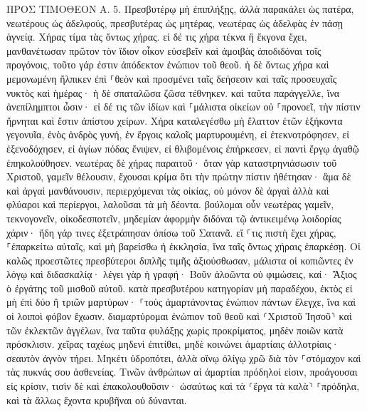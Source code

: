 \documentclass[twoside, 9pt]{extreport}
\begin{document}
ΠΡΟΣ ΤΙΜΟΘΕΟΝ Α.
5.
Πρεσβυτέρῳ μὴ ἐπιπλήξῃς, ἀλλὰ παρακάλει ὡς πατέρα, νεωτέρους ὡς ἀδελφούς, 
πρεσβυτέρας ὡς μητέρας, νεωτέρας ὡς ἀδελφὰς ἐν πάσῃ ἁγνείᾳ. 
Χήρας τίμα τὰς ὄντως χήρας. 
εἰ δέ τις χήρα τέκνα ἢ ἔκγονα ἔχει, μανθανέτωσαν πρῶτον τὸν ἴδιον οἶκον εὐσεβεῖν καὶ ἀμοιβὰς ἀποδιδόναι τοῖς προγόνοις, τοῦτο γάρ ἐστιν ἀπόδεκτον ἐνώπιον τοῦ θεοῦ. 
ἡ δὲ ὄντως χήρα καὶ μεμονωμένη ἤλπικεν ἐπὶ ⸀θεὸν καὶ προσμένει ταῖς δεήσεσιν καὶ ταῖς προσευχαῖς νυκτὸς καὶ ἡμέρας· 
ἡ δὲ σπαταλῶσα ζῶσα τέθνηκεν. 
καὶ ταῦτα παράγγελλε, ἵνα ἀνεπίλημπτοι ὦσιν· 
εἰ δέ τις τῶν ἰδίων καὶ ⸀μάλιστα οἰκείων οὐ ⸀προνοεῖ, τὴν πίστιν ἤρνηται καὶ ἔστιν ἀπίστου χείρων. 
Χήρα καταλεγέσθω μὴ ἔλαττον ἐτῶν ἑξήκοντα γεγονυῖα, ἑνὸς ἀνδρὸς γυνή, 
ἐν ἔργοις καλοῖς μαρτυρουμένη, εἰ ἐτεκνοτρόφησεν, εἰ ἐξενοδόχησεν, εἰ ἁγίων πόδας ἔνιψεν, εἰ θλιβομένοις ἐπήρκεσεν, εἰ παντὶ ἔργῳ ἀγαθῷ ἐπηκολούθησεν. 
νεωτέρας δὲ χήρας παραιτοῦ· ὅταν γὰρ καταστρηνιάσωσιν τοῦ Χριστοῦ, γαμεῖν θέλουσιν, 
ἔχουσαι κρίμα ὅτι τὴν πρώτην πίστιν ἠθέτησαν· 
ἅμα δὲ καὶ ἀργαὶ μανθάνουσιν, περιερχόμεναι τὰς οἰκίας, οὐ μόνον δὲ ἀργαὶ ἀλλὰ καὶ φλύαροι καὶ περίεργοι, λαλοῦσαι τὰ μὴ δέοντα. 
βούλομαι οὖν νεωτέρας γαμεῖν, τεκνογονεῖν, οἰκοδεσποτεῖν, μηδεμίαν ἀφορμὴν διδόναι τῷ ἀντικειμένῳ λοιδορίας χάριν· 
ἤδη γάρ τινες ἐξετράπησαν ὀπίσω τοῦ Σατανᾶ. 
εἴ ⸀τις πιστὴ ἔχει χήρας, ⸀ἐπαρκείτω αὐταῖς, καὶ μὴ βαρείσθω ἡ ἐκκλησία, ἵνα ταῖς ὄντως χήραις ἐπαρκέσῃ. 
Οἱ καλῶς προεστῶτες πρεσβύτεροι διπλῆς τιμῆς ἀξιούσθωσαν, μάλιστα οἱ κοπιῶντες ἐν λόγῳ καὶ διδασκαλίᾳ· 
λέγει γὰρ ἡ γραφή· Βοῦν ἀλοῶντα οὐ φιμώσεις, καί· Ἄξιος ὁ ἐργάτης τοῦ μισθοῦ αὐτοῦ. 
κατὰ πρεσβυτέρου κατηγορίαν μὴ παραδέχου, ἐκτὸς εἰ μὴ ἐπὶ δύο ἢ τριῶν μαρτύρων· 
⸀τοὺς ἁμαρτάνοντας ἐνώπιον πάντων ἔλεγχε, ἵνα καὶ οἱ λοιποὶ φόβον ἔχωσιν. 
διαμαρτύρομαι ἐνώπιον τοῦ θεοῦ καὶ ⸂Χριστοῦ Ἰησοῦ⸃ καὶ τῶν ἐκλεκτῶν ἀγγέλων, ἵνα ταῦτα φυλάξῃς χωρὶς προκρίματος, μηδὲν ποιῶν κατὰ πρόσκλισιν. 
χεῖρας ταχέως μηδενὶ ἐπιτίθει, μηδὲ κοινώνει ἁμαρτίαις ἀλλοτρίαις· σεαυτὸν ἁγνὸν τήρει. 
Μηκέτι ὑδροπότει, ἀλλὰ οἴνῳ ὀλίγῳ χρῶ διὰ τὸν ⸀στόμαχον καὶ τὰς πυκνάς σου ἀσθενείας. 
Τινῶν ἀνθρώπων αἱ ἁμαρτίαι πρόδηλοί εἰσιν, προάγουσαι εἰς κρίσιν, τισὶν δὲ καὶ ἐπακολουθοῦσιν· 
ὡσαύτως καὶ τὰ ⸂ἔργα τὰ καλὰ⸃ ⸀πρόδηλα, καὶ τὰ ἄλλως ἔχοντα κρυβῆναι οὐ δύνανται. 
\end{document}

